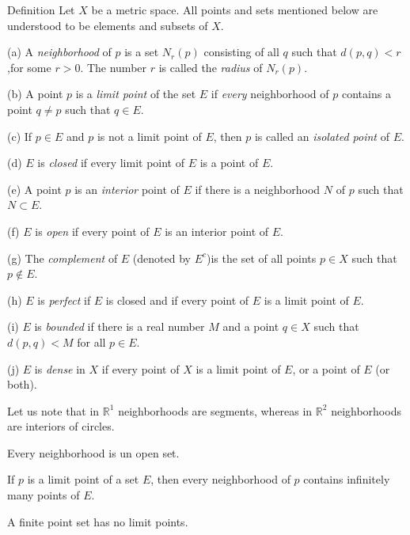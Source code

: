 \begin{myDef}\label{myDef:2.18 important}
    Definition Let $X$ be a metric space. All points and sets mentioned below are understood to be elements and subsets of $X$.

    (a) A \emph{neighborhood} of $p$ is a set $N_r(p)$ consisting of all $q$ such that $d(p, q) < r$,for some $r > 0$. The number $r$ is called the \emph{radius} of $N_r(p)$.

    (b) A point $p$ is a \emph{limit point} of the set $E$ if \emph{every} neighborhood of $p$ contains a point $q \neq p$ such that $q \in E$.
    
    (c) If $p \in E$ and $p$ is not a limit point of $E$, then $p$ is called an \emph{isolated point} of $E$.
    
    (d) $E$ is \emph{closed} if every limit point of $E$ is a point of $E$.
    
    (e) A point $p$ is an \emph{interior} point of $E$ if there is a neighborhood $N$ of $p$ such that $N \subset E$.
    
    (f) $E$ is \emph{open} if every point of $E$ is an interior point of $E$.
    
    (g) The \emph{complement} of $E$ (denoted by $E^c$)is the set of all points $p \in X$
    such that $p \not\in E$.
    
    (h) $E$ is \emph{perfect} if $E$ is closed and if every point of $E$ is a limit point
    of $E$.
    
    (i) $E$ is \emph{bounded} if there is a real number $M$ and a point $q \in X$ such that $d(p,q)< M$ for all $p \in E$.
    
    (j) $E$ is \emph{dense} in $X$ if every point of $X$ is a limit point of $E$, or a point of $E$ (or both).
\end{myDef}

Let us note that in $\mathbb{R}^1$ neighborhoods are segments, whereas in $\mathbb{R}^2$ neighborhoods are interiors of circles.

\begin{thm}\label{thm:2.19 neighbhood is open}
    Every neighborhood is un open set.
\end{thm}

\begin{thm}
    \label{thm:2.20}
    If $p$ is a limit point of a set $E$, then every neighborhood of $p$ contains infinitely many points of $E$.
\end{thm}

\begin{myCorollary}
    A finite point set has no limit points.
\end{myCorollary}

